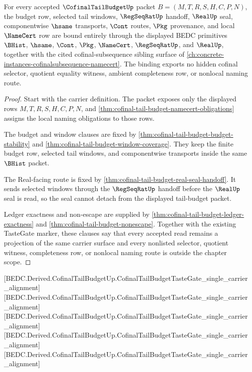 \begin{theorem}
\label{thm:cofinal-tail-budget-primitive-scope-binding}
For every accepted $\CofinalTailBudgetUp$ packet $B=(M,T,R,S,H,C,P,N)$, the budget row, selected tail windows, $\RegSeqRatUp$ handoff, $\RealUp$ seal, componentwise $\hsame$ transports, $\Cont$ routes, $\Pkg$ provenance, and local $\NameCert$ row are bound entirely through the displayed BEDC primitives $\BHist$, $\hsame$, $\Cont$, $\Pkg$, $\NameCert$, $\RegSeqRatUp$, and $\RealUp$, together with the cited cofinal-subsequence sibling surface of \autoref{ch:concrete-instances-cofinalsubsequence-namecert}. The binding exports no hidden cofinal selector, quotient equality witness, ambient completeness row, or nonlocal naming route.
\end{theorem}
\begin{proof}
Start with the carrier definition. The packet exposes only the displayed rows $M,T,R,S,H,C,P,N$, and \autoref{thm:cofinal-tail-budget-namecert-obligations} assigns the local naming obligations to those rows.

The budget and window clauses are fixed by \autoref{thm:cofinal-tail-budget-budget-stability} and \autoref{thm:cofinal-tail-budget-window-coverage}. They keep the finite budget row, selected tail windows, and componentwise transports inside the same $\BHist$ packet.

The Real-facing route is fixed by \autoref{thm:cofinal-tail-budget-real-seal-handoff}. It sends selected windows through the $\RegSeqRatUp$ handoff before the $\RealUp$ seal is read, so the seal cannot detach from the displayed tail-budget packet.

Ledger exactness and non-escape are supplied by \autoref{thm:cofinal-tail-budget-ledger-exactness} and \autoref{thm:cofinal-tail-budget-nonescape}. Together with the existing TasteGate marker, these clauses say that every accepted read remains a projection of the same carrier surface and every nonlisted selector, quotient witness, completeness row, or nonlocal naming route is outside the chapter scope.
\end{proof}

[BEDC.Derived.CofinalTailBudgetUp.CofinalTailBudgetTasteGate\_single\_carrier\_alignment]
[BEDC.Derived.CofinalTailBudgetUp.CofinalTailBudgetTasteGate\_single\_carrier\_alignment]
[BEDC.Derived.CofinalTailBudgetUp.CofinalTailBudgetTasteGate\_single\_carrier\_alignment]
[BEDC.Derived.CofinalTailBudgetUp.CofinalTailBudgetTasteGate\_single\_carrier\_alignment]
[BEDC.Derived.CofinalTailBudgetUp.CofinalTailBudgetTasteGate\_single\_carrier\_alignment]

